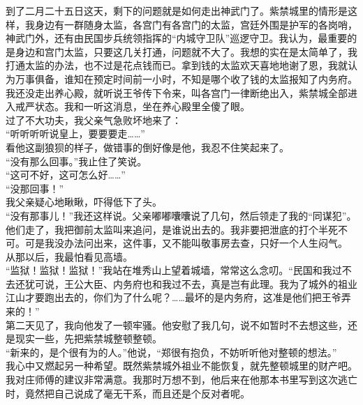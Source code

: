 到了二月二十五日这天，剩下的问题就是如何走出神武门了。紫禁城里的情形是这样，我身边有一群随身太监，各宫门有各宫门的太监，宫廷外围是护军的各岗哨，神武门外，还有由民国步兵统领指挥的“内城守卫队”巡逻守卫。我认为，最重要的是身边和宫门太监，只要这几关打通，问题就不大了。我想的实在是太简单了，我打通太监的办法，也不过是花点钱而已。拿到钱的太监欢天喜地地谢了恩，我就认为万事俱备，谁知在预定时间前一小时，不知是哪个收了钱的太监报知了内务府。我还没走出养心殿，就听说王爷传下令来，叫各宫门一律断绝出入，紫禁城全部进入戒严状态。我和一听这消息，坐在养心殿里全傻了眼。\\

过了不大功夫，我父亲气急败坏地来了：\\

“听听听听说皇上，要要要走……”\\

看他这副狼狈的样子，做错事的倒好像是他，我忍不住笑起来了。\\

“没有那么回事。”我止住了笑说。\\

“这可不好，这可怎么好……”\\

“没那回事！”\\

我父亲疑心地瞅瞅，吓得低下了头。\\

“没有那事儿！”我还这样说。父亲嘟嘟囔囔说了几句，然后领走了我的“同谋犯”。他们走了，我把御前太监叫来追问，是谁说出去的。我非要把泄底的打个半死不可。可是我没办法问出来，这件事，又不能叫敬事房去查，只好一个人生闷气。\\

从那以后，我最怕看见高墙。\\

“监狱！监狱！监狱！”我站在堆秀山上望着城墙，常常这么念叨。“民国和我过不去还犹可说，王公大臣、内务府也和我过不去，真是岂有此理。我为了城外的祖业江山才要跑出去的，你们为了什么呢？……最坏的是内务府，这准是他们把王爷弄来的！”\\

第二天见了，我向他发了一顿牢骚。他安慰了我几句，说不如暂时不去想这些，还是现实一些，先把紫禁城整顿整顿。\\

“新来的，是个很有为的人。”他说，“郑很有抱负，不妨听听他对整顿的想法。”\\

我心中又燃起另一种希望。既然紫禁城外祖业不能恢复，就先整顿城里的财产吧。我对庄师傅的建议非常满意。我那时万想不到，他后来在他那本书里写到这次逃亡时，竟然把自己说成了毫无干系，而且还是个反对者呢。
